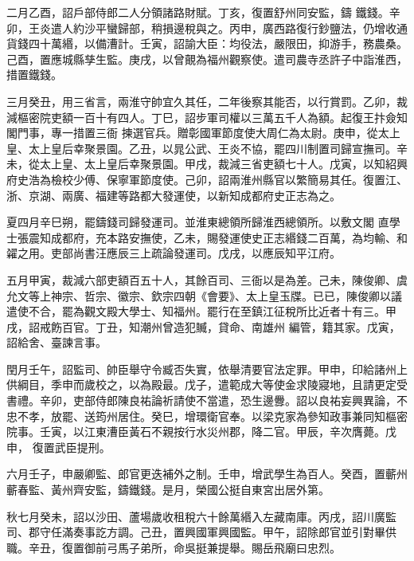 \begin{pinyinscope}
 二月乙酉，詔戶部侍郎二人分領諸路財賦。丁亥，復置舒州同安監，鑄
 鐵錢。辛卯，王炎遣人約沙平蠻歸部，稍損邊稅與之。丙申，廣西路復行鈔鹽法，仍增收通貨錢四十萬緡，以備漕計。壬寅，詔諭大臣：均役法，嚴限田，抑游手，務農桑。己酉，置應城縣孳生監。庚戌，以曾覿為福州觀察使。遣司農寺丞許子中詣淮西，措置鐵錢。



 三月癸丑，用三省言，兩淮守帥宜久其任，二年後察其能否，以行賞罰。乙卯，裁減樞密院吏額一百十有四人。丁巳，詔步軍司權以三萬五千人為額。起復王抃僉知閣門事，專一措置三衙
 揀選官兵。贈彰國軍節度使大周仁為太尉。庚申，從太上皇、太上皇后幸聚景園。乙丑，以晁公武、王炎不協，罷四川制置司歸宣撫司。辛未，從太上皇、太上皇后幸聚景園。甲戌，裁減三省吏額七十人。戊寅，以知紹興府史浩為檢校少傅、保寧軍節度使。己卯，詔兩淮州縣官以繁簡易其任。復置江、浙、京湖、兩廣、福建等路都大發運使，以新知成都府史正志為之。



 夏四月辛巳朔，罷鑄錢司歸發運司。並淮東總領所歸淮西總領所。以敷文閣
 直學士張震知成都府，充本路安撫使，乙未，賜發運使史正志緡錢二百萬，為均輸、和糴之用。吏部尚書汪應辰三上疏論發運司。戊戌，以應辰知平江府。



 五月甲寅，裁減六部吏額百五十人，其餘百司、三衙以是為差。己未，陳俊卿、虞允文等上神宗、哲宗、徽宗、欽宗四朝《會要》、太上皇玉牒。已已，陳俊卿以議遣使不合，罷為觀文殿大學士、知福州。罷行在至鎮江征稅所比近者十有三。甲戌，詔戒飭百官。丁丑，知潮州曾造犯贓，貸命、南雄州
 編管，籍其家。戊寅，詔給舍、臺諫言事。



 閏月壬午，詔監司、帥臣舉守令臧否失實，依舉清要官法定罪。甲申，印給諸州上供綱目，季申而歲校之，以為殿最。戊子，遣範成大等使金求陵寢地，且請更定受書禮。辛卯，吏部侍郎陳良祐論祈請使不當遣，恐生邊釁。詔以良祐妄興異論，不忠不孝，放罷、送筠州居住。癸巳，增環衛官奉。以梁克家為參知政事兼同知樞密院事。壬寅，以江東漕臣黃石不親按行水災州郡，降二官。甲辰，辛次膺薨。戊申，
 復置武臣提刑。



 六月壬子，申嚴卿監、郎官更迭補外之制。壬申，增武學生為百人。癸酉，置蘄州蘄春監、黃州齊安監，鑄鐵錢。是月，榮國公挺自東宮出居外第。



 秋七月癸未，詔以沙田、蘆場歲收租稅六十餘萬緡入左藏南庫。丙戌，詔川廣監司、郡守任滿奏事訖方調。己丑，置興國軍興國監。甲午，詔除郎官並引對畢供職。辛丑，復置御前弓馬子弟所，命吳挺兼提舉。賜岳飛廟曰忠烈。




\end{pinyinscope}
